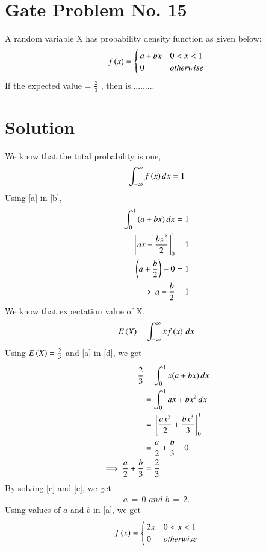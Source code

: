 \documentclass[journal,12pt,twocolumn]{IEEEtran}
\begin{document}
\section{Gate Problem No. 15}
A random variable X has probability density
function  as given below:
\begin{align}
f\left(x\right)
= 
\begin{cases}
a+bx & 0<x<1
\\
0 & otherwise
\end{cases}\label{a}
\end{align}
If the expected value  = $\frac{2}{3}$
, then  is..........
\section{Solution}
We know that the total probability is one,
\begin{equation}
    \int_{-\infty}^{\infty}{f\left(x\right) dx} = 1\label{b}
\end{equation}
Using \eqref{a} in \eqref{b},
\begin{align}
    \int_{0}^{1}{(a+bx)\,dx} = 1\\
    {}\left[ax+\frac{bx^2}{2}\right]_0^1=1\\
    \left(a+\frac{b}{2}\right)-0=1\\
    \implies a+\frac{b}{2}=1 \label{c}
\end{align}
We know that expectation value of X,
\begin{align}
    E\left(X\right)=\int_{-\infty}^{\infty}xf\left(x\right)\,dx\label{d}
\end{align}
\newpage
Using $E\left(X\right)=\frac{2}{3}$ and \eqref{a} in \eqref{d}, we get
\begin{align}
     \frac{2}{3}&=\int_{0}^{1}x(a+bx)\,dx\\
     &=\int_{0}^{1} ax+bx^2\,dx\\
     &= {}\left[\frac{ax^2}{2}+\frac{bx^3}{3}\right]_0^1\\
     &= \frac{a}{2}+\frac{b}{3}-0\\
     \implies\frac{a}{2}+\frac{b}{3}&=\frac{2}{3}\label{e}
\end{align}
By solving \eqref{c} and \eqref{e}, we get 
\begin{align}
    a\, =\, 0 \,\,and\,\, b\, =\, 2.
\end{align}
Using values of $a$ and $b$ in \eqref{a}, we get
\begin{align}
f\left(x\right)
= 
\begin{cases}
2x & 0<x<1
\\
0 & otherwise\label{f}\\
\end{cases}
\end{align}
\end{document}
